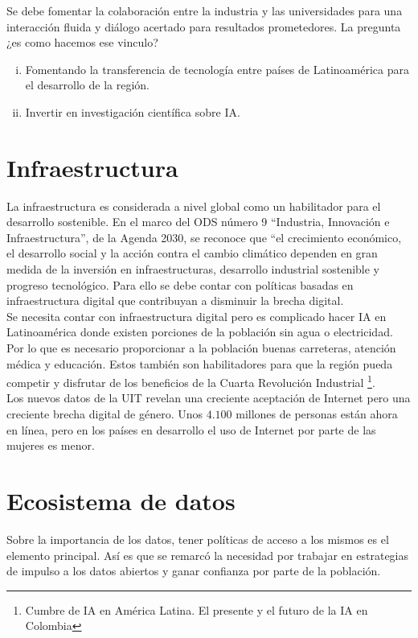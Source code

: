 \documentclass[10pt]{book}
\begin{document}
\begin{multicols}{2}
Se debe fomentar la colaboración entre la industria y las universidades para una interacción fluida y diálogo acertado para resultados prometedores. La pregunta ¿es como hacemos ese vinculo?
\begin{enumerate}[i)]
    \item Fomentando la transferencia de tecnología entre países de Latinoamérica para el desarrollo de la región.
    \item Invertir en investigación científica sobre IA.
\end{enumerate}

\section*{Infraestructura}
La infraestructura es considerada a nivel global como un habilitador para el desarrollo sostenible. En el marco del ODS número 9 $“$Industria, Innovación e Infraestructura$”$, de la Agenda 2030, se reconoce que $“$el crecimiento económico, el desarrollo social y la acción contra el cambio climático dependen en gran medida de la inversión en infraestructuras, desarrollo industrial sostenible y progreso tecnológico. Para ello se debe contar con políticas basadas en infraestructura digital que contribuyan a disminuir la brecha digital.\\ Se necesita contar con infraestructura digital pero es complicado hacer IA en Latinoamérica donde existen porciones de la población sin agua o electricidad. Por lo que es necesario proporcionar a la población buenas carreteras, atención médica y educación. Estos también son habilitadores para que la región pueda competir y disfrutar de los beneficios de la Cuarta Revolución Industrial \footnote{Cumbre de IA en América Latina. El presente y el futuro de la IA en Colombia}. \\
Los nuevos datos de la UIT revelan una creciente aceptación de Internet pero una creciente brecha digital de género. Unos $4.100$ millones de personas están ahora en línea, pero en los países en desarrollo el uso de Internet por parte de las mujeres es menor.\\

\section*{Ecosistema de datos}
Sobre la importancia de los datos, tener políticas de acceso a los mismos es el elemento principal. Así es que se remarcó la necesidad por trabajar en estrategias de impulso a los datos abiertos y ganar confianza por parte de la población.


\end{multicols}
\end{document}
